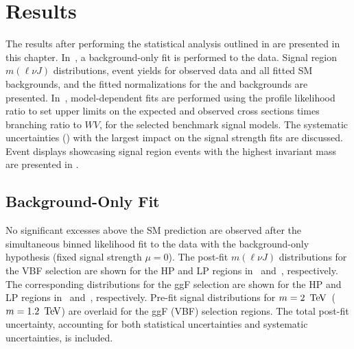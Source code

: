 \chapter{Results}
\label{ch:results}

The results after performing the statistical analysis outlined in \Ch{\ref{ch:stats}} are presented in this chapter. In~\Sect{\ref{sec:results:bkgonly}}, a background-only fit is performed to the data. Signal region $m(\ell\nu J)$ distributions, event yields for observed data and all fitted SM backgrounds, and the fitted normalizations for the \Wjets and \ttbar backgrounds are presented. In~\Sect{\ref{sec:limits}}, model-dependent fits are performed using the profile likelihood ratio to set upper limits on the expected and observed cross sections times branching ratio to $WV$, for the selected benchmark signal models. The systematic uncertainties (\Ch{\ref{ch:syst}}) with the largest impact on the signal strength fits are discussed. Event displays showcasing signal region events with the highest invariant mass are presented in \App{\ref{ch:eventDisplay}}.


\section{Background-Only Fit} 
\label{sec:results:bkgonly}
No significant excesses above the SM prediction are observed after the simultaneous binned likelihood fit to the data with the background-only hypothesis (fixed signal strength $\mu=0$). The post-fit $m(\ell\nu J)$ distributions for the VBF selection are shown for the HP and LP regions in~\Fig{\ref{fig:pf_hp_vbf}} and~\Fig{\ref{fig:pf_lp_vbf}}, respectively. The corresponding distributions for the ggF selection are shown for the HP and LP regions in~\Fig{\ref{fig:pf_hp_ggf}} and~\Fig{\ref{fig:pf_lp_ggf}}, respectively. Pre-fit signal distributions for $m=2\,\TeV$\, ($m=1.2\,\TeV$) are overlaid for the ggF (VBF) selection regions. The total post-fit uncertainty, accounting for both statistical uncertainties and systematic uncertainties, is included. 

